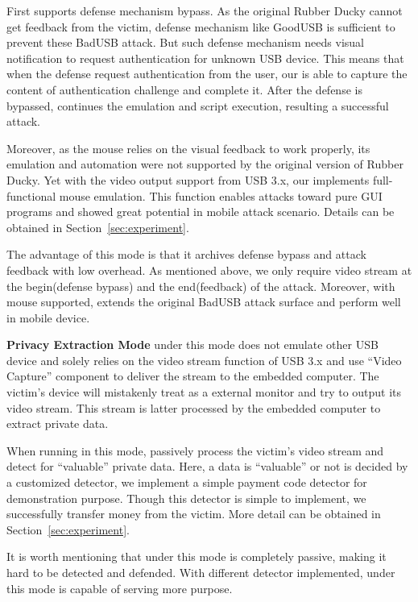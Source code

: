 First \tool supports defense mechanism bypass. As the original Rubber Ducky cannot get feedback from the victim, defense mechanism like GoodUSB \cite{tian2015defending} is sufficient to prevent these BadUSB attack. But such defense mechanism needs visual notification to request authentication for unknown USB device. This means that when the defense request authentication from the user, our \tool is able to capture the content of authentication challenge and complete it. After the defense is bypassed, \tool continues the emulation and script execution, resulting a successful attack.

Moreover, as the mouse relies on the visual feedback to work properly, its emulation and automation were not supported by the original version of Rubber Ducky. Yet with the video output support from USB 3.x, our \tool implements full-functional mouse emulation. This function enables attacks toward pure GUI programs and showed great potential in mobile attack scenario. Details can be obtained in Section~\ref{sec:experiment}.

The advantage of this mode is that it archives defense bypass and attack feedback with low overhead. As mentioned above, we only require video stream at the begin(defense bypass) and the end(feedback) of the attack. Moreover, with mouse supported, \tool extends the original BadUSB attack surface and perform well in mobile device.

\textbf{Privacy Extraction Mode}
\tool under this mode does not emulate other USB device and solely relies on the video stream function of USB 3.x and use ``Video Capture'' component to deliver the stream to the embedded computer. The victim's device will mistakenly treat \tool as a external monitor and try to output its video stream. This stream is latter processed by the embedded computer to extract private data.

When running in this mode, \tool passively process the victim's video stream and detect for ``valuable'' private data.  Here, a data is ``valuable'' or not is decided by a customized detector, we implement a simple payment code detector for demonstration purpose. Though this detector is simple to implement, we successfully transfer money from the victim. More detail can be obtained in Section~\ref{sec:experiment}.

It is worth mentioning that \tool under this mode is completely passive, making it hard to be detected and defended. With different detector implemented, \tool under this mode is capable of serving more purpose.

